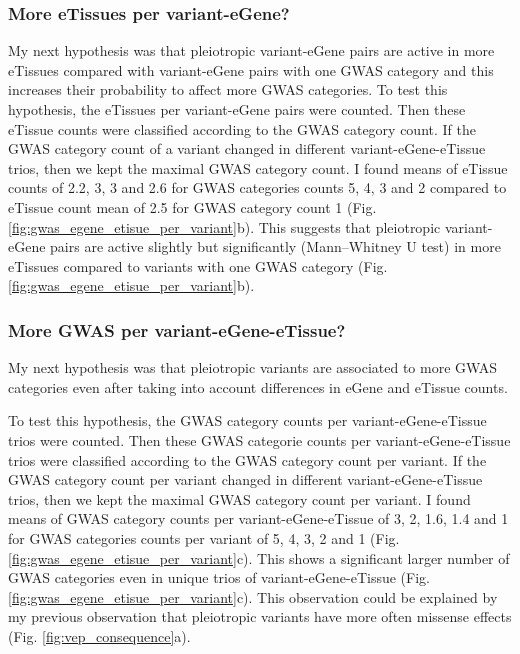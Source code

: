 \subsubsection*{More eTissues per variant-eGene?}

My next hypothesis was that pleiotropic variant-eGene pairs are active in more eTissues compared with variant-eGene pairs with one GWAS category and this increases their probability to affect more GWAS categories.
%
To test this hypothesis, the eTissues per variant-eGene pairs were counted.
%
Then these eTissue counts were classified according to the GWAS category count.
%
If the GWAS category count of a variant changed in different variant-eGene-eTissue trios, then we kept the maximal GWAS category count.
%
I found means of eTissue counts of 2.2, 3, 3 and 2.6 for GWAS categories counts 5, 4, 3 and 2 compared to eTissue count mean of 2.5 for GWAS category count 1 (Fig. \ref{fig:gwas_egene_etisue_per_variant}b).
%
This suggests that pleiotropic variant-eGene pairs are active slightly but significantly (Mann–Whitney U test) in more eTissues compared to variants with one GWAS category (Fig. \ref{fig:gwas_egene_etisue_per_variant}b).

\subsubsection*{More GWAS per variant-eGene-eTissue?}

My next hypothesis was that pleiotropic variants are associated to more GWAS categories even after taking into account differences in eGene and eTissue counts.

To test this hypothesis, the GWAS category counts per variant-eGene-eTissue trios were counted.
%
Then these GWAS categorie counts per variant-eGene-eTissue trios were classified according to the GWAS category count per variant.
%
If the GWAS category count per variant changed in different variant-eGene-eTissue trios, then we kept the maximal GWAS category count per variant.
%
I found means of GWAS category counts per variant-eGene-eTissue of 3, 2, 1.6, 1.4 and 1 for GWAS categories counts per variant of 5, 4, 3, 2 and 1 (Fig. \ref{fig:gwas_egene_etisue_per_variant}c).
%
This shows a significant larger number of GWAS categories even in unique trios of variant-eGene-eTissue (Fig. \ref{fig:gwas_egene_etisue_per_variant}c).
%
This observation could be explained by my previous observation that pleiotropic variants have more often missense effects (Fig. \ref{fig:vep_consequence}a).

